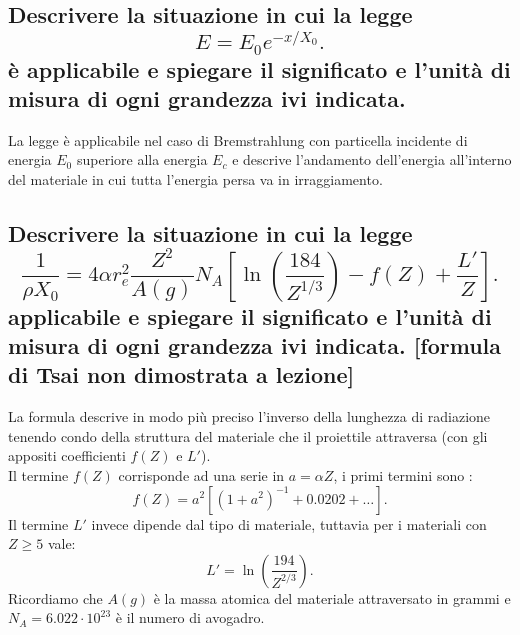 \subsection[\hspace{1mm} ]{Descrivere la situazione in cui la legge \[
	E = E_0 e^{-x /X_0}
.\] 
è applicabile e spiegare il significato e l'unità di misura di ogni grandezza ivi indicata.
}\label{sec:4.a.19}
La legge è applicabile nel caso di Bremstrahlung con particella incidente di energia $E_0$ superiore alla energia $E_{c}$ e descrive l'andamento dell'energia all'interno del materiale in cui tutta l'energia persa va in irraggiamento.
\subsection[\hspace{1mm} ]{Descrivere la situazione in cui la legge
	\[
		\frac{1}{\rho X_0} = 4 \alpha r^2_e\frac{Z^2}{A\left(g\right)}N_A\left[\ln\left(\frac{184}{Z^{1/3}}\right)-f\left(Z\right)+\frac{L'}{Z}\right] 
	.\] 
applicabile e spiegare il significato e l'unità di misura di ogni grandezza ivi indicata. [formula di Tsai non dimostrata a lezione]
}\label{sec:4.a.20}
La formula descrive in modo più preciso l'inverso della lunghezza di radiazione tenendo condo della struttura del materiale che il proiettile attraversa (con gli appositi coefficienti $f\left( Z\right) $ e $L'$).\\
Il termine $f\left( Z \right) $ corrisponde ad una serie in $a = \alpha Z$, i primi termini sono :
\[
	f\left( Z \right) = a^2\left[ \left( 1+a^2 \right)^{-1}+0.0202 + \ldots \right] 
.\] 
Il termine $L'$ invece dipende dal tipo di materiale, tuttavia per i materiali con $Z\ge 5$ vale:
\[
	L' = \ln\left( \frac{194}{Z^{2 /3}} \right) 
.\] 
Ricordiamo che $A\left( g \right) $ è la massa atomica del materiale attraversato in grammi e $N_A = 6.022 \cdot 10^{23} $ è il numero di avogadro.
